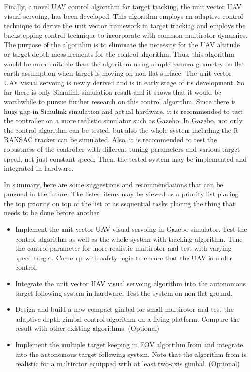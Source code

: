 Finally, a novel UAV control algorithm for target tracking, the unit vector UAV visual servoing, has been developed. This algorithm employs an adaptive control technique to derive the unit vector framework in target tracking and employs the backstepping control technique to incorporate with common multirotor dynamics. The purpose of the algorithm is to eliminate the necessity for the UAV altitude or target depth measurements for the control algorithm. Thus, this algorithm would be more suitable than the algorithm using simple camera geometry on flat earth assumption when target is moving on non-flat surface. The unit vector UAV visual servoing is newly derived and is in early stage of its development. So far there is only Simulink simulation result and it shows that it would be worthwhile to pursue further research on this control algorithm. Since there is huge gap in Simulink simulation and actual hardware, it is recommended to test the controller on a more realistic simulator such as Gazebo. In Gazebo, not only the control algorithm can be tested, but also the whole system including the R-RANSAC tracker can be simulated. Also, it is recommended to test the robustness of the controller with different tuning parameters and various target speed, not just constant speed. Then, the tested system may be implemented and integrated in hardware.

In summary, here are some suggestions and recommendations that can be pursued in the future. The listed items may be viewed as a priority list placing the top priority on top of the list or as sequential tasks placing the thing that needs to be done before another.
\begin{itemize}
	\item Implement the unit vector UAV visual servoing in Gazebo simulator. Test the control algorithm as well as the whole system with tracking algorithm. Tune the control parameter for more realistic multirotor and test with varying speed target. Come up with safety logic to ensure that the UAV is under control.
	\item Integrate the unit vector UAV visual servoing algorithm into the autonomous target following system in hardware. Test the system on non-flat ground. 
	\item Design and build a new compact gimbal for small multirotor and test the adaptive depth gimbal control algorithm on a flying platform. Compare the result with other existing algorithms. (Optional)
	\item Implement the multiple target keeping in FOV algorithm from \cite{Gans2011} and integrate into the autonomous target following system. Note that the algorithm from \cite{Gans2011} is realistic for a multirotor equipped with at least two-axis gimbal. (Optional)
\end{itemize}
